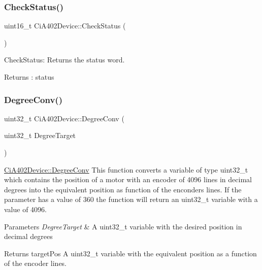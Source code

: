 \subsubsection{\texorpdfstring{Check\+Status()}{CheckStatus()}}
{\footnotesize\ttfamily uint16\+\_\+t Ci\+A402\+Device\+::\+Check\+Status (\begin{DoxyParamCaption}{ }\end{DoxyParamCaption})}



Check\+Status\+: Returns the status word. 

\begin{DoxyReturn}{Returns}
\+: status 
\end{DoxyReturn}
\mbox{\label{classCiA402Device_a485eaa3cbd186b6f29caf588c7010023}} 
\subsubsection{\texorpdfstring{Degree\+Conv()}{DegreeConv()}}
{\footnotesize\ttfamily uint32\+\_\+t Ci\+A402\+Device\+::\+Degree\+Conv (\begin{DoxyParamCaption}\item[{uint32\+\_\+t}]{Degree\+Target }\end{DoxyParamCaption})}



\hyperlink{classCiA402Device_a485eaa3cbd186b6f29caf588c7010023}{Ci\+A402\+Device\+::\+Degree\+Conv} This function converts a variable of type uint32\+\_\+t which contains the position of a motor with an encoder of 4096 lines in decimal degrees into the equivalent position as function of the enconders lines. If the parameter has a value of 360 the function will return an uint32\+\_\+t variable with a value of 4096. 


\begin{DoxyParams}{Parameters}
{\em Degree\+Target} & A uint32\+\_\+t variable with the desired position in decimal degrees \\
\hline
\end{DoxyParams}
\begin{DoxyReturn}{Returns}
target\+Pos A uint32\+\_\+t variable with the equivalent position as a function of the encoder lines. 
\end{DoxyReturn}
\mbox{\label{classCiA402Device_ac8d9e36e6f457565cac7d26d91e4a712}} 
